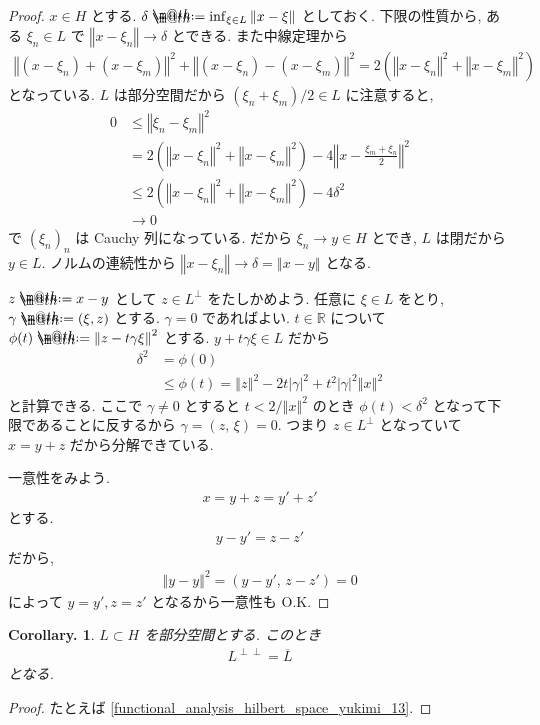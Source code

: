 \documentclass[openany, a4paper, oneside]{jsbook}
\makeatletter
\newcommand*{\defeq}{\mathrel{\rlap{%
\raisebox{0.3ex}{$\m@th\cdot$}}%
\raisebox{-0.3ex}{$\m@th\cdot$}}%
=}
\theoremstyle{break}
\theoremstyle{breakdefn}
\newtheorem{cor}[thm]{Corollary.}
\newcommand{\abs}[1]{\left|#1\right|}
\newcommand{\norm}[1]{\left\Vert#1\right\Vert}
\newcommand{\rbk}[1]{\left (#1\right)}
\newcommand{\rbkt}[2]{\left ( #1,\,#2 \right)}
\makeatother
\begin{document}
\begin{proof}
$x \in H$ とする.
$\delta \defeq \inf_{\xi \in L} \norm{x - \xi}$ としておく.
下限の性質から, ある $\xi_n \in L$ で
$\norm{x - \xi_n} \to \delta$ とできる.
また中線定理から
\begin{align}
 \norm{\rbk{x - \xi_n} + \rbk{x - \xi_m}}^2 + \norm{\rbk{x - \xi_n} - \rbk{x - \xi_m}}^2
 =
  2 \rbk{\norm{x - \xi_n}^2 + \norm{x - \xi_m}^2}
\end{align}
となっている.
$L$ は部分空間だから $\rbk{\xi_n + \xi_m} / 2 \in L$ に注意すると,
\begin{align}
 0
 &\le
 \norm{\xi_n - \xi_m}^2 \\
 &=
 2 \rbk{\norm{x - \xi_n}^2 + \norm{x - \xi_m}^2}
  -4 \norm{x - \frac{\xi_m + \xi_n}{2}}^2 \\
 &\le
 2 \rbk{\norm{x - \xi_n}^2 + \norm{x - \xi_m}^2} - 4 \delta^2 \\
 &\to 0
\end{align}
で $(\xi_n)_n$ は Cauchy 列になっている.
だから $\xi_n \to y \in H$ とでき, $L$ は閉だから $y \in L$.
ノルムの連続性から $\norm{x - \xi_n} \to \delta = \norm{x - y}$ となる.

$z \defeq x-y$ として $z \in L^{\perp}$ をたしかめよう.
任意に $\xi \in L$ をとり, $\gamma \defeq (\xi, z)$ とする.
$\gamma = 0$ であればよい.
$t \in \mathbb{R}$ について $\phi(t) \defeq \norm{z - t \gamma \xi}^2$ とする.
$y + t \gamma \xi \in L$ だから
\begin{align}
 \delta^2
 &=
  \phi(0) \\
 &\le
  \phi(t)
 =
 \norm{z}^2 - 2 t \abs{\gamma}^2 + t^2 \abs{\gamma}^2 \norm{x}^2
\end{align}
と計算できる.
ここで $\gamma \neq 0$ とすると $t < 2 / \norm{x}^2$ のとき
$\phi(t) < \delta^2$ となって下限であることに反するから $\gamma = \rbkt{z}{\xi} = 0$.
つまり $z \in L^{\perp}$ となっていて $x = y + z$ だから分解できている.

一意性をみよう.
\begin{align}
 x
 =
 y + z
 =
 y' + z'
\end{align}
とする.
\begin{align}
 y - y'
 =
 z - z'
\end{align}
だから,
\begin{align}
 \norm{y - y}^2
 =
 \rbkt{y - y'}{z - z'}
 =
 0
\end{align}
によって $y=y', z=z'$ となるから一意性も O.K.
\end{proof}

\begin{cor}
 $L \subset H$ を部分空間とする.
 このとき
 \begin{align}
   L^{\perp \perp} = \overline{L}
 \end{align}
 となる.
\end{cor}
\begin{proof}
たとえば \ref{functional_analysis_hilbert_space_yukimi_13}.
\end{proof}
\end{document}
